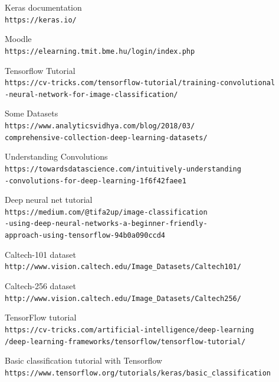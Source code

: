\documentclass[12pt,spanish]{article}
\begin{document}
\newpage
\begin{thebibliography}{9}

Keras documentation
\\\texttt{https://keras.io/}

Moodle
\\\texttt{https://elearning.tmit.bme.hu/login/index.php}

Tensorflow Tutorial
\\\texttt{https://cv-tricks.com/tensorflow-tutorial/training-convolutional\\-neural-network-for-image-classification/}

Some Datasets
\\\texttt{https://www.analyticsvidhya.com/blog/2018/03/\\comprehensive-collection-deep-learning-datasets/}


Understanding Convolutions
\\\texttt{https://towardsdatascience.com/intuitively-understanding\\-convolutions-for-deep-learning-1f6f42faee1}

Deep neural net tutorial
\\\texttt{https://medium.com/@tifa2up/image-classification\\-using-deep-neural-networks-a-beginner-friendly-\\approach-using-tensorflow-94b0a090ccd4}

Caltech-101 dataset
\\\texttt{http://www.vision.caltech.edu/Image\_Datasets/Caltech101/}


Caltech-256 dataset
\\\texttt{http://www.vision.caltech.edu/Image\_Datasets/Caltech256/}


TensorFlow tutorial
\\\texttt{https://cv-tricks.com/artificial-intelligence/deep-learning\\/deep-learning-frameworks/tensorflow/tensorflow-tutorial/}

Basic classification tutorial with Tensorflow
\\\texttt{https://www.tensorflow.org/tutorials/keras/basic\_classification}



\end{thebibliography}
\end{document}
